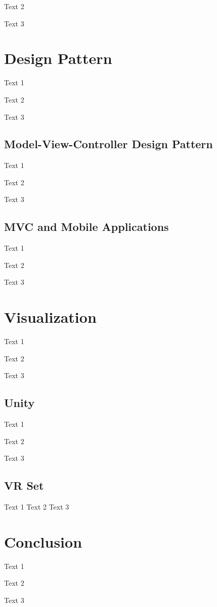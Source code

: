 Text 2

Text 3

\section{Design Pattern} \label{sec:b4}
Text 1

Text 2

Text 3

\subsection{Model-View-Controller Design Pattern} \label{sec:b4.1}
Text 1

Text 2

Text 3

\subsection{MVC and Mobile Applications} \label{sec:b4.2}
Text 1

Text 2

Text 3

\section{Visualization} \label{sec:b5}
Text 1

Text 2

Text 3

\subsection{Unity} \label{sec:b5.1}
Text 1

Text 2

Text 3

\subsection{VR Set} \label{sec:b5.2}
Text 1
Text 2
Text 3

\section{Conclusion} \label{sec:b6}
Text 1

Text 2

Text 3